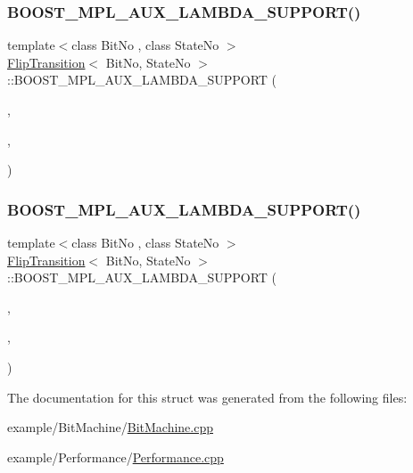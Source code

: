 \subsubsection{\texorpdfstring{B\+O\+O\+S\+T\+\_\+\+M\+P\+L\+\_\+\+A\+U\+X\+\_\+\+L\+A\+M\+B\+D\+A\+\_\+\+S\+U\+P\+P\+O\+R\+T()}{BOOST\_MPL\_AUX\_LAMBDA\_SUPPORT()}\hspace{0.1cm}{\footnotesize\ttfamily [1/2]}}
{\footnotesize\ttfamily template$<$class Bit\+No , class State\+No $>$ \\
\mbox{\hyperlink{struct_flip_transition}{Flip\+Transition}}$<$ Bit\+No, State\+No $>$\+::B\+O\+O\+S\+T\+\_\+\+M\+P\+L\+\_\+\+A\+U\+X\+\_\+\+L\+A\+M\+B\+D\+A\+\_\+\+S\+U\+P\+P\+O\+RT (\begin{DoxyParamCaption}\item[{2}]{,  }\item[{\mbox{\hyperlink{struct_flip_transition}{Flip\+Transition}}$<$ Bit\+No, State\+No $>$}]{,  }\item[{(Bit\+No, State\+No)}]{ }\end{DoxyParamCaption})}

\mbox{\label{struct_flip_transition_ad9b80d15c35a0bff9e0f9ff8b0219d16}} 
\subsubsection{\texorpdfstring{B\+O\+O\+S\+T\+\_\+\+M\+P\+L\+\_\+\+A\+U\+X\+\_\+\+L\+A\+M\+B\+D\+A\+\_\+\+S\+U\+P\+P\+O\+R\+T()}{BOOST\_MPL\_AUX\_LAMBDA\_SUPPORT()}\hspace{0.1cm}{\footnotesize\ttfamily [2/2]}}
{\footnotesize\ttfamily template$<$class Bit\+No , class State\+No $>$ \\
\mbox{\hyperlink{struct_flip_transition}{Flip\+Transition}}$<$ Bit\+No, State\+No $>$\+::B\+O\+O\+S\+T\+\_\+\+M\+P\+L\+\_\+\+A\+U\+X\+\_\+\+L\+A\+M\+B\+D\+A\+\_\+\+S\+U\+P\+P\+O\+RT (\begin{DoxyParamCaption}\item[{3}]{,  }\item[{\mbox{\hyperlink{struct_flip_transition}{Flip\+Transition}}$<$ Bit\+No, State\+No $>$}]{,  }\item[{(Bit\+No, State\+No, First\+Transition\+Bit)}]{ }\end{DoxyParamCaption})}



The documentation for this struct was generated from the following files\+:\begin{DoxyCompactItemize}
\item 
example/\+Bit\+Machine/\mbox{\hyperlink{_bit_machine_8cpp}{Bit\+Machine.\+cpp}}\item 
example/\+Performance/\mbox{\hyperlink{_performance_8cpp}{Performance.\+cpp}}\end{DoxyCompactItemize}

